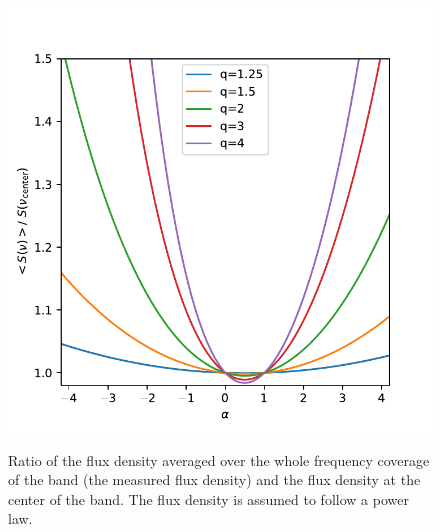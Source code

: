 \documentclass[12pt]{mythesis}
\begin{document}
\begin{figure}[h!]
\begin{center}
\includegraphics[width=1.0\textwidth]{figures/flux_bandcenter.pdf}\\
\caption[Spectral setup]{
	Ratio of the flux density averaged over the whole frequency coverage of the band (the measured flux density) and the flux density at the center of the band. The flux density is assumed to follow a power law. 
\label{fig:flux_bandcenter}}
\end{center}
 \end{figure}





% 




\cleardoublepage
{}
\cleardoublepage
{}
{}
\listoffigures

\cleardoublepage
{}
{}
\listoftables





\cleardoublepage
\layout
\end{document}
